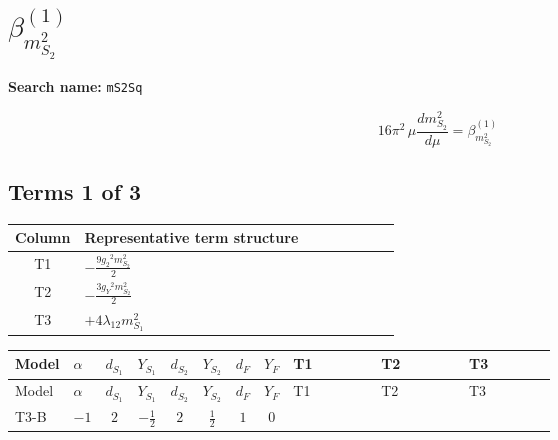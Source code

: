 \documentclass[8pt]{article}
\begin{document}
\begin{landscape}
\begin{longtable}{@{}llcccccc >{\raggedright\arraybackslash}p{0.21\linewidth} >{\raggedright\arraybackslash}p{0.21\linewidth}@{}}
\midrule
\bottomrule
\end{longtable}
\clearpage
\section*{$\beta_{m_{S_2}^2}^{(1)}$}
\noindent\textbf{Search name: }\texttt{mS2Sq}\par\smallskip
\[16\pi^2\,\mu\frac{d m_{S_2}^2}{d\mu}=\beta_{m_{S_2}^2}^{(1)}\]
\subsection*{Terms 1 of 3}
\begin{center}
\begin{tabular}{@{}c >{\raggedright\arraybackslash}p{0.82\linewidth}@{}}
\toprule
Column & Representative term structure \\
\midrule
T1 & \(\displaystyle -\frac{9 {g_2}^2 {m_{S_2}^2}}{2}\) \\
\midrule
T2 & \(\displaystyle -\frac{3 {g_Y}^2 {m_{S_2}^2}}{2}\) \\
\midrule
T3 & \(\displaystyle +4 {\lambda_{12}} {m_{S_1}^2}\) \\
\midrule
\bottomrule
\end{tabular}
\end{center}
\smallskip
\tiny
\begin{longtable}{@{}llcccccc >{\raggedright\arraybackslash}p{0.21\linewidth} >{\raggedright\arraybackslash}p{0.21\linewidth} >{\raggedright\arraybackslash}p{0.21\linewidth}@{}}
\toprule
Model & $\alpha$ & $d_{S_1}$ & $Y_{S_1}$ & $d_{S_2}$ & $Y_{S_2}$ & $d_F$ & $Y_F$ & T1 & T2 & T3 \\
\midrule
\endfirsthead
\toprule
Model & $\alpha$ & $d_{S_1}$ & $Y_{S_1}$ & $d_{S_2}$ & $Y_{S_2}$ & $d_F$ & $Y_F$ & T1 & T2 & T3 \\
\midrule
\endhead
T3-B & $-1$ & $2$ & $-\frac{1}{2}$ & $2$ & $\frac{1}{2}$ & $1$ & $0$ & \scriptsize\adjustbox{max width=\linewidth}{$\begin{gathered} -\frac{9 {g_2}^2 {m_{S_2}^2}}{2}\end{gathered}$} & \scriptsize\adjustbox{max width=\linewidth}{$\begin{gathered} -\frac{3 {g_Y}^2 {m_{S_2}^2}}{2}\end{gathered}$} & \scriptsize\adjustbox{max width=\linewidth}{$\begin{gathered} +4 {\lambda_{12}} {m_{S_1}^2}\end{gathered}$} \\

\end{longtable}
\end{landscape}
\end{document}
